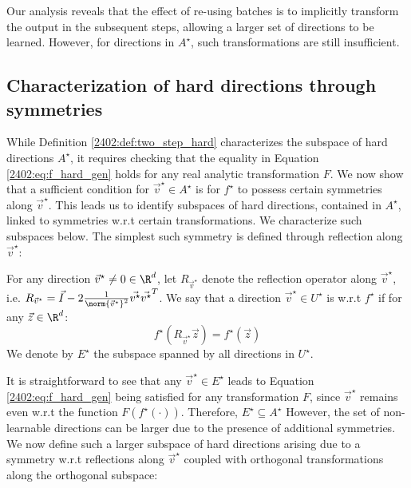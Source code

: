 Our analysis reveals that the effect of re-using batches is to implicitly transform the output in the subsequent steps, allowing a larger set of directions to be learned. However, for directions in $A^\star$, such transformations are still insufficient.

\subsection{Characterization of hard directions through symmetries}

While Definition \ref{2402:def:two_step_hard} characterizes the subspace of hard directions 
$A^\star$, it requires checking that the equality in Equation \ref{2402:eq:f_hard_gen} holds for any real analytic transformation $F$.
We now show that a sufficient condition for $\vec{v}^\star \in A^\star$ is for $f^\star$ to possess certain symmetries along  $\vec{v}^\star$. This leads us to identify subspaces of hard directions, contained in $A^\star$, linked to symmetries w.r.t certain transformations. We characterize such subspaces below. The simplest such symmetry is defined through reflection along $\vec{v}^\star$:

\begin{definition}\label{2402:def:symmetric_subspace}
   For any direction $\vec{v}^\star \neq 0 \in \R^d$, let $R_{\vec{v}^\star}$ denote the reflection operator along $\vec{v}^\star$, i.e. $R_{\vec{v}^\star}=\vec{I}-2\frac{1}{\norm{\vec v^\star}^2}\vec{v^\star}\vec{v^\star}^T$. We say that a direction $\vec{v}^\star \in U^\star$ is  w.r.t $f^\star$ if for any $\vec{z} \in \R^d$:
    \begin{equation}
        f^\star(R_{\vec{v}^\star}\vec{z})= f^\star(\vec{z})
    \end{equation}
    We denote by $E^\star$ the subspace spanned by all  directions in $U^\star$.
\end{definition} 
It is straightforward to see that any $\vec{v}^\star \in E^\star$ leads to Equation \ref{2402:eq:f_hard_gen} being satisfied for any transformation $F$, since $\vec{v}^\star$ remains even w.r.t the function $F\left(f^\star (\cdot)\right)$. Therefore, $E^\star \subseteq A^\star$
However, the set of non-learnable directions can be larger due to the presence of additional symmetries. We now define such a larger subspace of hard directions arising due to a symmetry w.r.t reflections along $\vec{v}^\star$ coupled with orthogonal transformations along the orthogonal subspace:

